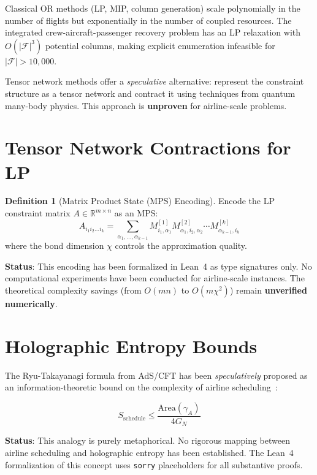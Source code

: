 \documentclass[11pt,a4paper]{book}
\theoremstyle{definition}
\newtheorem{definition}[theorem]{Definition}
\begin{document}
Classical OR methods (LP, MIP, column generation) scale polynomially in
the number of flights but exponentially in the number of coupled resources.
The integrated crew-aircraft-passenger recovery problem has an LP relaxation
with $O(|\mathcal{F}|^3)$ potential columns, making explicit enumeration
infeasible for $|\mathcal{F}| > 10{,}000$.

Tensor network methods offer a \emph{speculative} alternative: represent
the constraint structure as a tensor network and contract it using
techniques from quantum many-body physics. This approach is
\textbf{unproven} for airline-scale problems.

\section{Tensor Network Contractions for LP}

\begin{definition}[Matrix Product State (MPS) Encoding]
Encode the LP constraint matrix $A \in \mathbb{R}^{m \times n}$ as an MPS:
\begin{equation}
  A_{i_1 i_2 \ldots i_k} = \sum_{\alpha_1, \ldots, \alpha_{k-1}}
    M^{[1]}_{i_1, \alpha_1} M^{[2]}_{\alpha_1, i_2, \alpha_2}
    \cdots M^{[k]}_{\alpha_{k-1}, i_k}
\end{equation}
where the bond dimension $\chi$ controls the approximation quality.
\end{definition}

\textbf{Status}: This encoding has been formalized in Lean~4 as type
signatures only. No computational experiments have been conducted for
airline-scale instances. The theoretical complexity savings (from $O(mn)$
to $O(m \chi^2)$) remain \textbf{unverified numerically}.

\section{Holographic Entropy Bounds}

The Ryu-Takayanagi formula from AdS/CFT has been \emph{speculatively}
proposed as an information-theoretic bound on the complexity of airline
scheduling~\cite{AlienMath2025}:

\begin{equation}
  S_{\text{schedule}} \leq \frac{\text{Area}(\gamma_A)}{4 G_N}
\end{equation}

\textbf{Status}: This analogy is purely metaphorical. No rigorous mapping
between airline scheduling and holographic entropy has been established.
The Lean~4 formalization of this concept uses \texttt{sorry} placeholders
for all substantive proofs.
\end{document}
